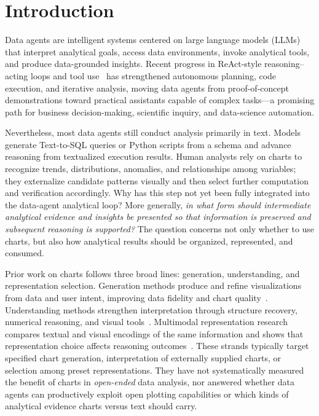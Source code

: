 \documentclass{article}
\begin{document}
\section{Introduction}
\label{sec:introduction}

Data agents are intelligent systems centered on large language models (LLMs) that interpret analytical goals, access data environments, invoke analytical tools, and produce data-grounded insights.
Recent progress in ReAct-style reasoning--acting loops and tool use~\citep{yao2023react} has strengthened autonomous planning, code execution, and iterative analysis, moving data agents from proof-of-concept demonstrations toward practical assistants capable of complex tasks---a promising path for business decision-making, scientific inquiry, and data-science automation.

Nevertheless, most data agents still conduct analysis primarily in text.
Models generate Text-to-SQL queries or Python scripts from a schema and advance reasoning from textualized execution results.
Human analysts rely on charts to recognize trends, distributions, anomalies, and relationships among variables; they externalize candidate patterns visually and then select further computation and verification accordingly.
Why has this step not yet been fully integrated into the data-agent analytical loop?
More generally, \emph{in what form should intermediate analytical evidence and insights be presented so that information is preserved and subsequent reasoning is supported?}
The question concerns not only whether to use charts, but also how analytical results should be organized, represented, and consumed.

Prior work on charts follows three broad lines: generation, understanding, and representation selection.
Generation methods produce and refine visualizations from data and user intent, improving data fidelity and chart quality~\citep{dibia2023lida,yang2024matplotagent,yang2025chartmimic,namgoong2025amace,lu2026multivisagent,wang2025chartoptimiser}.
Understanding methods strengthen interpretation through structure recovery, numerical reasoning, and visual tools~\citep{masry2023unichart,han2023chartllama,xu2023chartbench,liu2023deplot,liu2023matcha,zhang2024tinychart,kaur2026chartagent,das2025chartsofthought}.
Multimodal representation research compares textual and visual encodings of the same information and shows that representation choice affects reasoning outcomes~\citep{zhou2025fres,ho2026formatmatters,xing2026tabledart,lin2026evidfuse}.
These strands typically target specified chart generation, interpretation of externally supplied charts, or selection among preset representations.
They have not systematically measured the benefit of charts in \emph{open-ended} data analysis, nor answered whether data agents can productively exploit open plotting capabilities or which kinds of analytical evidence charts versus text should carry.
\end{document}
